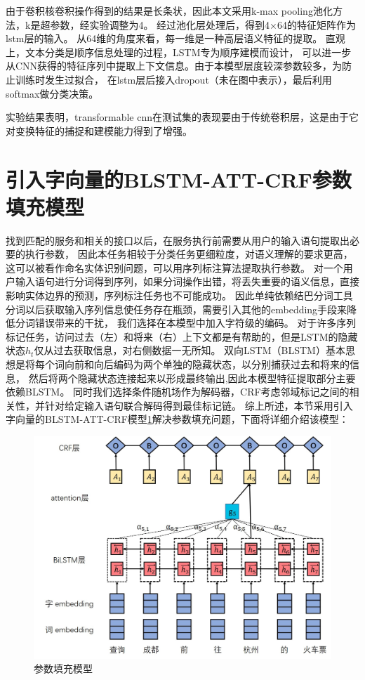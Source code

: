 由于卷积核卷积操作得到的结果是长条状，因此本文采用k-max pooling池化方法，k是超参数，经实验调整为4。
经过池化层处理后，得到4×64的特征矩阵作为lstm层的输入。
从64维的角度来看，每一维是一种高层语义特征的提取。
直观上，文本分类是顺序信息处理的过程，LSTM专为顺序建模而设计，
可以进一步从CNN获得的特征序列中提取上下文信息。由于本模型层度较深参数较多，为防止训练时发生过拟合，
在lstm层后接入dropout（未在图中表示），最后利用softmax做分类决策。

实验结果表明，transformable cnn在测试集的表现要由于传统卷积层，这是由于它对变换特征的捕捉和建模能力得到了增强。
\section{引入字向量的BLSTM-ATT-CRF参数填充模型}
找到匹配的服务和相关的接口以后，在服务执行前需要从用户的输入语句提取出必要的执行参数，
因此本任务相较于分类任务更细粒度，对语义理解的要求更高，
这可以被看作命名实体识别问题，可以用序列标注算法提取执行参数。
对一个用户输入语句进行分词得到序列，如果分词操作出错，将丢失重要的语义信息，直接影响实体边界的预测，序列标注任务也不可能成功。
因此单纯依赖结巴分词工具分词以后获取输入序列信息使任务存在瓶颈，需要引入其他的embedding手段来降低分词错误带来的干扰，
我们选择在本模型中加入字符级的编码。
对于许多序列标记任务，访问过去（左）和将来（右）上下文都是有帮助的，但是LSTM的隐藏状态$h_t$仅从过去获取信息，对右侧数据一无所知。 
双向LSTM（BLSTM）\cite{chen2017improving}基本思想是将每个词向前和向后编码为两个单独的隐藏状态，以分别捕获过去和将来的信息，
然后将两个隐藏状态连接起来以形成最终输出,因此本模型特征提取部分主要依赖BLSTM。
同时我们选择条件随机场作为解码器，CRF考虑邻域标记之间的相关性，并针对给定输入语句联合解码得到最佳标记链。
综上所述，本节采用引入字向量的BLSTM-ATT-CRF模型\ref{fig:blstm-att-crf}解决参数填充问题，下面将详细介绍该模型：


\begin{figure}[htbp]
  \centering
  \includegraphics[width=15cm]{./images/blstm-att-crf.jpg}
  \caption{参数填充模型}
  \label{fig:blstm-att-crf}
\end{figure}

